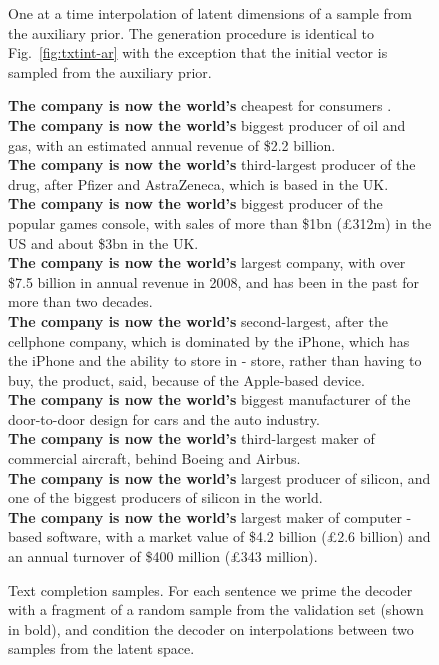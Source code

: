 \documentclass{article} \usepackage{iclr2019_conference,times}
\def\figref#1{figure~\ref{#1}}
\renewcommand{\figref}[1]{Fig.~\ref{#1}}
\begin{document}
\begin{figure}[h!]
\begin{tcolorbox}
\end{tcolorbox}
\caption{One at a time interpolation of latent dimensions of a sample from the auxiliary prior. The generation procedure is identical to \figref{fig:txtint-ar} with the exception that the initial vector is sampled from the auxiliary prior.}\label{fig:txtint-aux}
\end{figure}


\begin{figure}[h!]
\centering
\begin{tcolorbox}

\small
\textup{
\textbf{The company is now the world's} cheapest for consumers  . }\\
\textup{
\textbf{The company is now the world's} biggest producer of oil and gas, with an estimated annual revenue of \$2.2 billion.}\\

\textup{
\textbf{The company is now the world's} third-largest producer of the drug, after Pfizer and AstraZeneca, which is based in the UK.}\\

\textup{
\textbf{The company is now the world's} biggest producer of the popular games console, with sales of more than \$1bn (£312m) in the US and about \$3bn in the UK.}\\
\textup{
\textbf{The company is now the world's} largest company, with over \$7.5 billion in annual revenue in 2008, and has been in the past for more than two decades.}\\

\textup{
\textbf{The company is now the world's} second-largest, after the cellphone company, which is dominated by the iPhone,  which has the iPhone and the ability to store in - store, rather than having to buy, the product, said,  because of the Apple-based device.}\\
\textup{
\textbf{The company is now the world's} biggest manufacturer of the door-to-door design for cars and the auto industry. }\\
\textup{
\textbf{The company is now the world's} third-largest maker of commercial aircraft, behind Boeing and Airbus.}\\
\textup{
\textbf{The company is now the world's} largest producer of silicon, and one of the biggest producers of silicon in the world.}\\
\textup{
\textbf{The company is now the world's} largest maker of computer -based software, with a market value of \$4.2 billion (£2.6 billion) and an annual turnover of \$400 million  (£343 million).}\\

\end{tcolorbox}
\caption{Text completion samples. For each sentence we prime the decoder with a fragment of a random sample
from the validation set (shown in bold), and condition the decoder on interpolations between two samples from the latent space.}\label{fig:txtint}
\end{figure}



 
\end{document}
